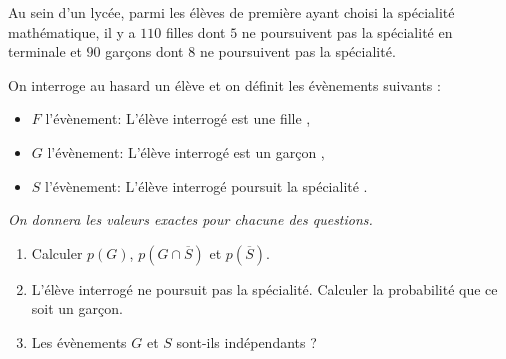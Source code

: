 \medskip

Au sein d'un lycée, parmi les élèves de première ayant choisi la spécialité mathématique, il y a $110$ filles dont $5$ ne poursuivent pas la spécialité en terminale et $90$ garçons dont $8$ ne poursuivent pas la spécialité.

On interroge au hasard un élève et on définit les évènements suivants :

\setlength\parindent{9mm}
\begin{itemize}[label=\textbullet]
\item $F$ l'évènement: \og L'élève interrogé est une fille \fg,
\item $G$ l'évènement: \og L'élève interrogé est un garçon \fg,
\item $S$ l'évènement: \og L'élève interrogé poursuit la spécialité \fg.
\end{itemize}
\setlength\parindent{0mm}

\emph{On donnera les valeurs exactes pour chacune des questions.}

\medskip

\begin{enumerate}
\item Calculer $p(G)$, $p\left(G \cap \overline{S}\right)$ et $p\left(\overline{S}\right)$.
\item L'élève interrogé ne poursuit pas la spécialité. Calculer la probabilité que ce soit
un garçon.
\item  Les évènements $G$ et $S$ sont-ils indépendants ?
\end{enumerate}

\bigskip
